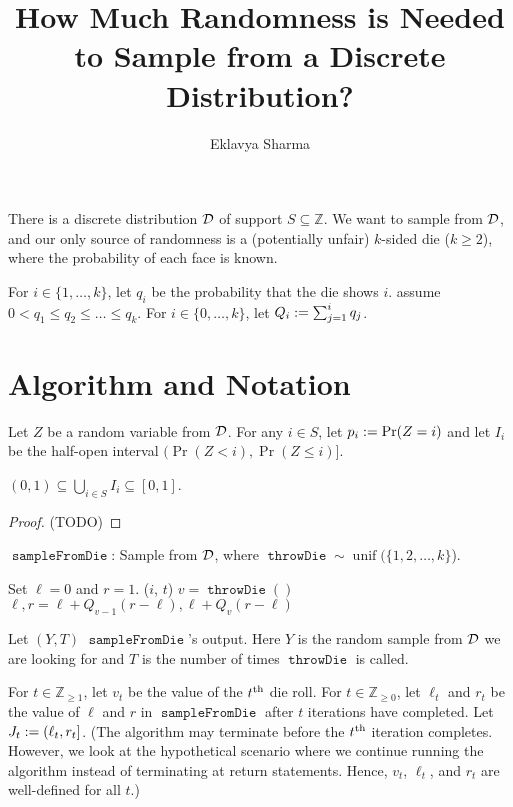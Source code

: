 \documentclass[a4paper, 12pt, fleqn]{article}
\author{Eklavya Sharma}
\date{\empty}
\title{How Much Randomness is Needed to Sample from a Discrete Distribution?}
\DeclareMathOperator{\sampleFromDie}{\mathtt{sampleFromDie}}
\DeclareMathOperator{\throwDie}{\mathtt{throwDie}}
\DeclareMathOperator{\unif}{unif}
\begin{document}
\maketitle
\setlength{\parskip}{0.2em}

There is a discrete distribution $\mathcal{D}$ of support $S \subseteq \mathbb{Z}$.
We want to sample from $\mathcal{D}$, and our only source of randomness is a
(potentially unfair) $k$-sided die ($k \ge 2$), where the probability of each face is known.

For $i \in \{1, \ldots, k\}$, let $q_i$ be the probability that the die shows $i$.
\WLoG{} assume $0 < q_1 \le q_2 \le \ldots \le q_k$.
For $i \in \{0, \ldots, k\}$, let $Q_i := \sum_{j=1}^i q_j$.

\section{Algorithm and Notation}

Let $Z$ be a random variable from $\mathcal{D}$.
For any $i \in S$, let $p_i := \Pr(Z = i)$
and let $I_i$ be the half-open interval $(\Pr(Z < i), \Pr(Z \le i)]$.

\begin{lemma}
$(0, 1) \subseteq \bigcup_{i \in S} I_i \subseteq [0, 1]$.
\end{lemma}
\begin{proof}
(TODO)
\end{proof}

\begin{algorithm}[htb]
\caption{$\sampleFromDie$: Sample from $\mathcal{D}$, where $\throwDie \sim \unif(\{1, 2, \ldots, k\}$).}
\begin{algorithmic}[1]
\State Set $\ell = 0$ and $r = 1$.
    \If{$(\ell, r] \subseteq I_i$ for some $i \in S$}
        \State \Return ($i$, $t$)
    \EndIf
    \State $v = \throwDie()$
    \State $\ell, r = \ell + Q_{v-1}(r - \ell), \ell + Q_v(r - \ell)$
\EndFor
\end{algorithmic}
\end{algorithm}

Let $(Y, T)$ $\sampleFromDie$'s output.
Here $Y$ is the random sample from $\mathcal{D}$ we are looking for
and $T$ is the number of times $\throwDie$ is called.

For $t \in \mathbb{Z}_{\ge 1}$, let $v_t$ be the value of the $t^{\textrm{th}}$ die roll.
For $t \in \mathbb{Z}_{\ge 0}$, let $\ell_t$ and $r_t$ be the value of $\ell$ and $r$
in $\sampleFromDie$ after $t$ iterations have completed.
Let $J_t := (\ell_t, r_t]$.
(The algorithm may terminate before the $t^{\textrm{th}}$ iteration completes.
However, we look at the hypothetical scenario where we continue running the algorithm
instead of terminating at return statements.
Hence, $v_t$, $\ell_t$, and $r_t$ are well-defined for all $t$.)
\end{document}
